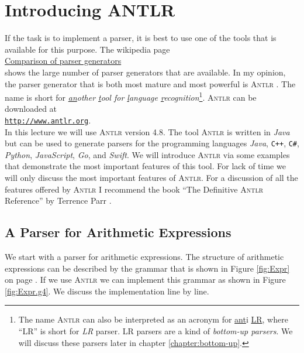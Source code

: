 \chapter{Introducing ANTLR}
If the task is to implement a parser, it is best to use one of the tools that is available for this purpose.
The wikipedia page 
\\[0.2cm]
\hspace*{1.3cm}
\href{https://en.wikipedia.org/wiki/Comparison_of_parser_generators}{Comparison of parser generators}
\\[0.2cm]
shows the large number of parser generators that are available.
In my opinion, the parser generator that is both most mature and most powerful is
\textsc{Antlr}  \cite{parr:2012,parr:2014}.  The name is short for 
\emph{\underline{an}other \underline{t}ool for \underline{l}anguage \underline{r}ecognition}\footnote{
  The name \textsc{Antlr} can also be interpreted as an acronym for \underline{ant}i \underline{LR},
  where ``LR'' is short for \emph{LR} parser.  LR parsers are a kind of \emph{bottom-up parsers}.  We will discuss these
  parsers later in chapter \ref{chapter:bottom-up}.
}.
\textsc{Antlr} can be downloaded at 
\\[0.2cm]
\hspace*{1.3cm}
\href{http://www.antlr.org}{\texttt{http://www.antlr.org}}.
\\[0.2cm]
In this lecture we will use \textsc{Antlr} version 4.8.  The tool \textsc{Antlr} is written in \textsl{Java}
but can be used to generate parsers for the programming languages \textsl{Java}, \texttt{C++}, \texttt{C\#},
\textsl{Python}, \textsl{JavaScript}, \textsl{Go}, and \textsl{Swift}.
We will introduce \textsc{Antlr} via some examples that demonstrate the most important features of this tool.
For lack of time we will only discuss the most important features of \textsc{Antlr}.  For a discussion of all
the features offered by \textsc{Antlr} I recommend the book ``The Definitive \textsc{Antlr} Reference'' by
Terrence Parr \cite{parr:2012}.

\section{A Parser for Arithmetic Expressions}
We start with a parser for arithmetic expressions.  The structure of arithmetic expressions can be described by
the grammar that is shown in Figure \ref{fig:Expr} on page \pageref{fig:Expr}.
If we use \textsc{Antlr} we can implement this grammar as shown in Figure \ref{fig:Expr.g4}.  
We discuss the implementation line by line.

